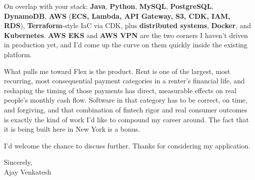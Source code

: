 \documentclass[letterpaper,11pt]{article}
\begin{document}
On overlap with your stack: \textbf{Java}, \textbf{Python}, \textbf{MySQL}, \textbf{PostgreSQL}, \textbf{DynamoDB}, \textbf{AWS} (\textbf{ECS, Lambda, API Gateway, S3, CDK, IAM, RDS}), \textbf{Terraform}-style IaC via CDK, plus \textbf{distributed systems}, \textbf{Docker}, and \textbf{Kubernetes}. \textbf{AWS EKS} and \textbf{AWS VPN} are the two corners I haven't driven in production yet, and I'd come up the curve on them quickly inside the existing platform.

What pulls me toward Flex is the product. Rent is one of the largest, most recurring, most consequential payment categories in a renter's financial life, and reshaping the timing of those payments has direct, measurable effects on real people's monthly cash flow. Software in that category has to be correct, on time, and forgiving, and that combination of fintech rigor and real consumer outcomes is exactly the kind of work I'd like to compound my career around. The fact that it is being built here in New York is a bonus.

I'd welcome the chance to discuss further. Thanks for considering my application.

\vspace{12pt}
Sincerely, \\
Ajay Venkatesh
\end{document}
